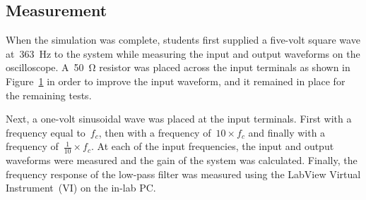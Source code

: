 \subsection{Measurement}
When the simulation was complete, students first supplied a five-volt square
wave at~\SI{363}{\hertz} to the system while measuring the input and output
waveforms on the oscilloscope.  A~\SI{50}{\ohm} resistor was placed across the
input terminals as shown in Figure~\ref{f:realSchem} in order to improve the
input waveform, and it remained in place for the remaining tests.
%
\begin{figure}[H]
	\centering
	
	\label{f:realSchem}
\end{figure}
%
Next, a one-volt sinusoidal wave was placed at the input terminals.  First with
a frequency equal to~$f_c$, then with a frequency of~$10 \times f_c$ and
finally with a frequency of~$\frac{1}{10} \times f_c$.  At each of the input
frequencies, the input and output waveforms were measured and the gain of the
system was calculated.  Finally, the frequency response of the low-pass filter
was measured using the LabView Virtual Instrument~(VI) on the in-lab PC.
